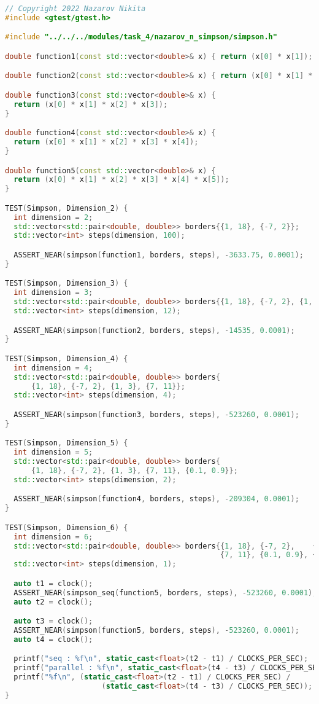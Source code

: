 \documentclass{report}
\begin{document}
\begin{lstlisting}[language=C++]
// Copyright 2022 Nazarov Nikita
#include <gtest/gtest.h>

#include "../../../modules/task_4/nazarov_n_simpson/simpson.h"

double function1(const std::vector<double>& x) { return (x[0] * x[1]); }

double function2(const std::vector<double>& x) { return (x[0] * x[1] * x[2]); }

double function3(const std::vector<double>& x) {
  return (x[0] * x[1] * x[2] * x[3]);
}

double function4(const std::vector<double>& x) {
  return (x[0] * x[1] * x[2] * x[3] * x[4]);
}

double function5(const std::vector<double>& x) {
  return (x[0] * x[1] * x[2] * x[3] * x[4] * x[5]);
}

TEST(Simpson, Dimension_2) {
  int dimension = 2;
  std::vector<std::pair<double, double>> borders{{1, 18}, {-7, 2}};
  std::vector<int> steps(dimension, 100);

  ASSERT_NEAR(simpson(function1, borders, steps), -3633.75, 0.0001);
}

TEST(Simpson, Dimension_3) {
  int dimension = 3;
  std::vector<std::pair<double, double>> borders{{1, 18}, {-7, 2}, {1, 3}};
  std::vector<int> steps(dimension, 12);

  ASSERT_NEAR(simpson(function2, borders, steps), -14535, 0.0001);
}

TEST(Simpson, Dimension_4) {
  int dimension = 4;
  std::vector<std::pair<double, double>> borders{
      {1, 18}, {-7, 2}, {1, 3}, {7, 11}};
  std::vector<int> steps(dimension, 4);

  ASSERT_NEAR(simpson(function3, borders, steps), -523260, 0.0001);
}

TEST(Simpson, Dimension_5) {
  int dimension = 5;
  std::vector<std::pair<double, double>> borders{
      {1, 18}, {-7, 2}, {1, 3}, {7, 11}, {0.1, 0.9}};
  std::vector<int> steps(dimension, 2);

  ASSERT_NEAR(simpson(function4, borders, steps), -209304, 0.0001);
}

TEST(Simpson, Dimension_6) {
  int dimension = 6;
  std::vector<std::pair<double, double>> borders{{1, 18}, {-7, 2},    {1, 3},
                                                 {7, 11}, {0.1, 0.9}, {2, 3}};
  std::vector<int> steps(dimension, 1);

  auto t1 = clock();
  ASSERT_NEAR(simpson_seq(function5, borders, steps), -523260, 0.0001);
  auto t2 = clock();

  auto t3 = clock();
  ASSERT_NEAR(simpson(function5, borders, steps), -523260, 0.0001);
  auto t4 = clock();

  printf("seq : %f\n", static_cast<float>(t2 - t1) / CLOCKS_PER_SEC);
  printf("parallel : %f\n", static_cast<float>(t4 - t3) / CLOCKS_PER_SEC);
  printf("%f\n", (static_cast<float>(t2 - t1) / CLOCKS_PER_SEC) /
                      (static_cast<float>(t4 - t3) / CLOCKS_PER_SEC));
}
\end{lstlisting}
\end{document}
